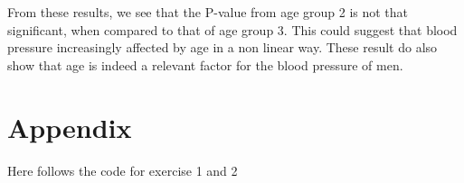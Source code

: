 \documentclass[a4paper, 10pt, reqno]{amsart}
\begin{document}
From these results, we see that the P-value from age group 2 is not that significant, when compared to that of age group 3. This could suggest that blood pressure increasingly affected by age in a non linear way. These result do also show that age is indeed a relevant factor for the blood pressure of men.

\section{Appendix}
Here follows the code for exercise 1 and 2






\nocite{*}
{}

\end{document}
